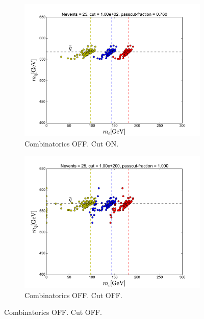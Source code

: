 \documentclass[twoside,english]{uiofysmaster}
\begin{document}
\begin{figure}[hbt]
	\centering
	\begin{subfigure}[b]{0.49\textwidth}
		\includegraphics[width=\textwidth]{figures/making-sense/20150214_simplistic_events_with_gauss_and_exp_smearing_cut-100.pdf} 
		\caption{Combinatorics OFF. Cut ON.}
	\end{subfigure}
	\begin{subfigure}[b]{0.49\textwidth}
		\includegraphics[width=\textwidth]{figures/making-sense/20150214_simplistic_events_with_gauss_and_exp_smearing_nocut.pdf} 
		\caption{Combinatorics OFF. Cut OFF.}
	\end{subfigure}


\end{figure}
\end{document}
